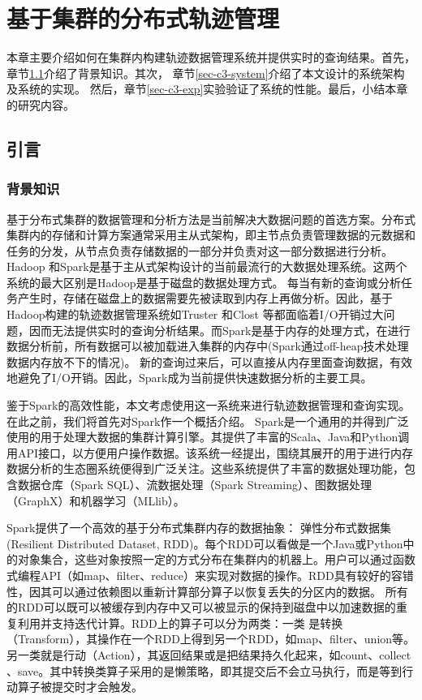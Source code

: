 \chapter{基于集群的分布式轨迹管理}\label{chapter:system}
本章主要介绍如何在集群内构建轨迹数据管理系统并提供实时的查询结果。首先，章节\ref{sec-c3-background}介绍了背景知识。其次，
章节\ref{sec-c3-system}介绍了本文设计的系统架构及系统的实现。
然后，章节\ref{sec-c3-exp}实验验证了系统的性能。最后，小结本章的研究内容。

\section{引言}\label{sec-c3-background}
\subsection{背景知识}
基于分布式集群的数据管理和分析方法是当前解决大数据问题的首选方案。分布式集群内的存储和计算方案通常采用主从式架构，即主节点负责管理数据的元数据和任务的分发，从节点负责存储数据的一部分并负责对这一部分数据进行分析。
Hadoop 和Spark是基于主从式架构设计的当前最流行的大数据处理系统。这两个系统的最大区别是Hadoop是基于磁盘的数据处理方式。
每当有新的查询或分析任务产生时，存储在磁盘上的数据需要先被读取到内存上再做分析。因此，基于Hadoop构建的轨迹数据管理系统如Truster \cite{YangMQZ09}和Clost \cite{TanLN12}等都面临着I/O开销过大问题，因而无法提供实时的查询分析结果。而Spark是基于内存的处理方式，在进行数据分析前，所有数据可以被加载进入集群的内存中(Spark通过off-heap技术处理数据内存放不下的情况)。
新的查询过来后，可以直接从内存里面查询数据，有效地避免了I/O开销。因此，Spark成为当前提供快速数据分析的主要工具。

鉴于Spark的高效性能，本文考虑使用这一系统来进行轨迹数据管理和查询实现。在此之前，我们将首先对Spark作一个概括介绍。
Spark是一个通用的并得到广泛使用的用于处理大数据的集群计算引擎。其提供了丰富的Scala、Java和Python调用API接口，以方便用户操作数据。该系统一经提出，围绕其展开的用于进行内存数据分析的生态圈系统便得到广泛关注。这些系统提供了丰富的数据处理功能，包含数据仓库（Spark SQL）、流数据处理（Spark Streaming）、图数据处理（GraphX）和机器学习（MLlib）。

Spark提供了一个高效的基于分布式集群内存的数据抽象：
弹性分布式数据集(Resilient Distributed Dataset, RDD)。每个RDD可以看做是一个Java或Python中的对象集合，这些对象按照一定的方式分布在集群内的机器上。用户可以通过函数式编程API（如map、filter、reduce）来实现对数据的操作。RDD具有较好的容错性，因其可以通过依赖图以重新计算部分算子以恢复丢失的分区内的数据。
所有的RDD可以既可以被缓存到内存中又可以被显示的保持到磁盘中以加速数据的重复利用并支持迭代计算。RDD上的算子可以分为两类：一类 是转换（Transform），其操作在一个RDD上得到另一个RDD，如map、filter、union等。另一类就是行动（Action），其返回结果或是把结果持久化起来，如count、collect 、save。其中转换类算子采用的是懒策略，即其提交后不会立马执行，而是等到行动算子被提交时才会触发。

